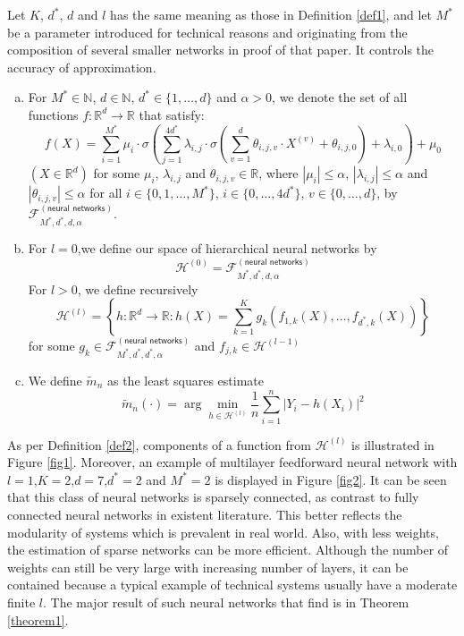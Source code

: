 \begin{definition}
Let $K$, $d^*$, $d$ and $l$ has the same meaning as those in Definition \ref{def1}, and let $M^*$ be a parameter introduced for technical reasons and originating from the composition of several smaller networks in proof of that paper. It controls the accuracy of approximation. 

\begin{enumerate}[(a)]
    \item For $M^* \in \mathbb{N}$, $d \in \mathbb{N}$, $d^* \in \{1,\ldots, d\}$ and $\alpha >0$, we denote the set of all functions $f: \mathbb{R}^d \rightarrow \mathbb{R}$ that satisfy:
    \[f(X) = \sum_{i=1}^{M^*}\mu_i \cdot \sigma \left( \sum_{j=1}^{4d^*} \lambda_{i,j}\cdot \sigma\left(\sum_{v=1}^{d} \theta_{i,j,v}\cdot X^{(v)} +\theta_{i,j,0}\right) +\lambda_{i,0} \right)+\mu_0\]
    $(X \in \mathbb{R}^d)$ for some $\mu_{i}$, $\lambda_{i,j}$ and $\theta_{i,j,v} \in \mathbb{R}$, where $|\mu_i|\le\alpha$, $|\lambda_{i,j}|\le\alpha$ and $|\theta_{i,j,v}|\le\alpha$ for all $i \in \{0,1,\ldots, M^*\}$, $i \in \{0,\ldots,4d^*\}$, $v \in \{0,\ldots,d\}$, by $\mathcal{F}_{M^*,d^*,d,\alpha}^{(\textsf{neural networks})}$.
    \item For $l=0$,we define our space of hierarchical neural networks by \[\mathcal{H}^{(0)}=\mathcal{F}_{M^*,d^*,d,\alpha}^{(\textsf{neural networks})}\]
    For $l>0$, we define recursively \[ \mathcal{H}^{(l)}=\left\{h:\mathbb{R}^d \rightarrow \mathbb{R}: h(X)=\sum_{k=1}^K g_k(f_{1,k}(X),\ldots,f_{d^*,k}(X))\right\}\] 
    for some $g_k \in \mathcal{F}_{M^*,d^*,d^*,\alpha}^{(\textsf{neural networks})}$ and $f_{j,k} \in \mathcal{H}^{(l-1)}$
    \item We define $\tilde{m}_n$ as the least squares estimate \[\tilde{m}_n(\cdot)=\arg\min_{h\in\mathcal{H}^{(l)}}\frac{1}{n}\sum_{i=1}^n|Y_i-h(X_i)|^2\]
\end{enumerate}
\label{def2}
\end{definition}

As per Definition \ref{def2}, components of a function from $\mathcal{H}^{(l)}$ is illustrated in Figure \ref{fig1}. Moreover, an example of multilayer feedforward neural network with $l=1$,$K=2$,$d=7$,$d^*=2$ and $M^*=2$ is displayed in Figure \ref{fig2}. It can be seen that this class of neural networks is sparsely connected, as contrast to fully connected neural networks in existent literature. This better reflects the modularity of systems which is prevalent in real world. Also, with less weights, the estimation of sparse networks can be more efficient. Although the number of weights can still be very large with increasing number of layers, it can be contained because a typical example of technical systems usually have a moderate finite $l$. The major result of such neural networks that \cite{Bauer2019} find is in Theorem \ref{theorem1}.

